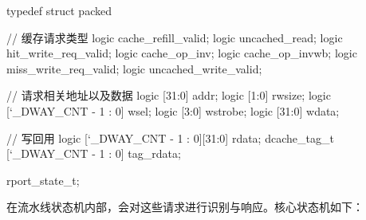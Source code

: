 \begin{CodeBlock}[language=BookSystemVerilog]
typedef struct packed {
          // 缓存请求类型
          logic cache_refill_valid;
          logic uncached_read;
          logic hit_write_req_valid;
          logic cache_op_inv;
          logic cache_op_invwb;
          logic miss_write_req_valid;
          logic uncached_write_valid;

          // 请求相关地址以及数据
          logic [31:0] addr;
          logic [1:0] rwsize;
          logic [`_DWAY_CNT - 1 : 0] wsel;
          logic [3:0] wstrobe;
          logic [31:0] wdata;

          // 写回用
          logic [`_DWAY_CNT - 1 : 0][31:0] rdata;
          dcache_tag_t [`_DWAY_CNT - 1 : 0] tag_rdata;
        } rport_state_t;
\end{CodeBlock}

在流水线状态机内部，会对这些请求进行识别与响应。核心状态机如下：

